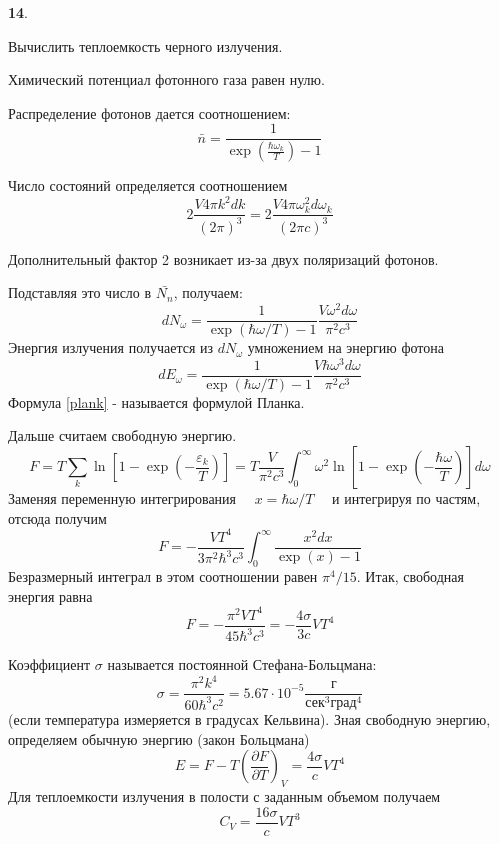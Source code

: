 \documentclass[a4paper,12pt]{article} %
\begin{document}
\begin{ttask}\textbf{14}. 

Вычислить теплоемкость черного излучения. 



Химический потенциал
фотонного газа равен нулю. 

Распределение фотонов дается
соотношением:
\[ \bar{n}=\frac{1}{\operatorname{exp}\left(\frac{\hbar \omega_{k}}{T}\right)-1} \]

Число состояний определяется соотношением
$$
2 \frac{V 4 \pi k^{2} d k}{(2 \pi)^{3}}=2 \frac{V 4 \pi \omega_{k}^{2} d \omega_{k}}{(2 \pi c)^{3}}
$$

Дополнительный фактор 2 возникает из-за двух поляризаций фотонов.

Подставляя это число в $ \bar{N_{n}}$, получаем:
$$
d N_{\omega}=\frac{1}{\exp (\hbar \omega / T)-1} \frac{V \omega^{2} d \omega}{\pi^{2} c^{3}}
$$
Энергия излучения получается из $ d N_{\omega} $ умножением на энергию фотона
\begin{equation}\label{plank}
d E_{\omega}=
\frac{1}{\exp (\hbar \omega / T)-1} \frac{V \hbar \omega^{3} d \omega}{\pi^{2} c^{3}}
\end{equation}
Формула \ref{plank} - называется формулой Планка. 

Дальше считаем свободную энергию.
$$
	F=T \sum_{k} \ln \left[1-\exp \left(-\frac{\varepsilon_{k}}{T}\right)\right]
	=T \frac{V}{\pi^{2} c^{3}} \int_{0}^{\infty} \omega^{2} \ln \left[1-\exp \left(-\frac{\hbar \omega}{T}\right)\right] d \omega
$$
Заменяя переменную интегрирования $\quad x=\hbar \omega / T \quad$ и интегрируя по
частям, отсюда получим
$$
F=-\frac{V T^{4}}{3 \pi^{2} \hbar^{3} c^{3}} \int_{0}^{\infty} \frac{x^{2} d x}{\exp (x)-1}
$$
Безразмерный интеграл в этом соотношении равен $\pi^{4} / 15 .$ Итак, свободная энергия равна
$$
F=-\frac{\pi^{2} V T^{4}}{45 \hbar^{3} c^{3}}=-\frac{4 \sigma}{3 c} V T^{4}
$$


Коэффициент $\sigma$ называется постоянной Стефана-Больцмана:
$$
\sigma=\frac{\pi^{2} k^{4}}{60 \hbar^{3} c^{2}}=5.67 \cdot 10^{-5} \frac{\text{г}}{\text{сек}^{3}\text{град}^{4} }
$$
(если температура измеряется в градусах Кельвина). Зная свободную энергию, определяем обычную энергию (закон Больцмана)
$$
E=F-T\left(\frac{\partial F}{\partial T}\right)_{V}=\frac{4 \sigma}{c} V T^{4}
$$
Для теплоемкости излучения в полости с заданным объемом получаем
$$
C_{V}=\frac{16 \sigma}{c} V T^{3}
$$


















 

\end{ttask}
\end{document}
